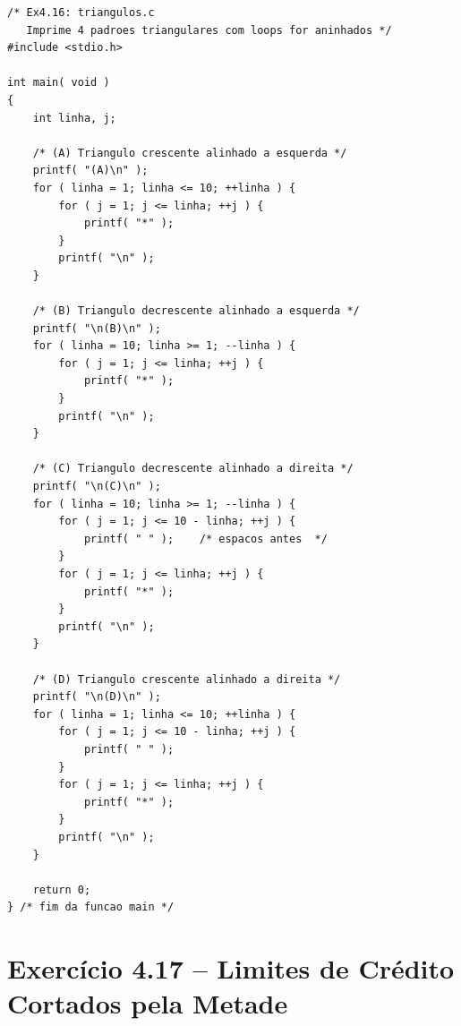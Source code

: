 \documentclass[12pt,a4paper]{article}
\begin{document}
\begin{respostabox}
\begin{lstlisting}
/* Ex4.16: triangulos.c
   Imprime 4 padroes triangulares com loops for aninhados */
#include <stdio.h>

int main( void )
{
    int linha, j;

    /* (A) Triangulo crescente alinhado a esquerda */
    printf( "(A)\n" );
    for ( linha = 1; linha <= 10; ++linha ) {
        for ( j = 1; j <= linha; ++j ) {
            printf( "*" );
        }
        printf( "\n" );
    }

    /* (B) Triangulo decrescente alinhado a esquerda */
    printf( "\n(B)\n" );
    for ( linha = 10; linha >= 1; --linha ) {
        for ( j = 1; j <= linha; ++j ) {
            printf( "*" );
        }
        printf( "\n" );
    }

    /* (C) Triangulo decrescente alinhado a direita */
    printf( "\n(C)\n" );
    for ( linha = 10; linha >= 1; --linha ) {
        for ( j = 1; j <= 10 - linha; ++j ) {
            printf( " " );    /* espacos antes  */
        }
        for ( j = 1; j <= linha; ++j ) {
            printf( "*" );
        }
        printf( "\n" );
    }

    /* (D) Triangulo crescente alinhado a direita */
    printf( "\n(D)\n" );
    for ( linha = 1; linha <= 10; ++linha ) {
        for ( j = 1; j <= 10 - linha; ++j ) {
            printf( " " );
        }
        for ( j = 1; j <= linha; ++j ) {
            printf( "*" );
        }
        printf( "\n" );
    }

    return 0;
} /* fim da funcao main */
\end{lstlisting}
\end{respostabox}

\section{Exercício 4.17 -- Limites de Crédito Cortados pela Metade}
\end{document}
